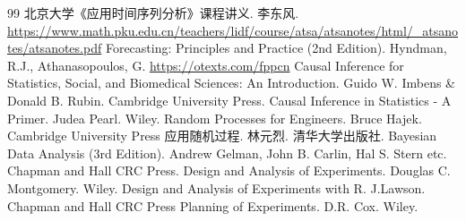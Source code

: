 \begin{thebibliography}{99}
    北京大学《应用时间序列分析》课程讲义. 李东风. \url{https://www.math.pku.edu.cn/teachers/lidf/course/atsa/atsanotes/html/_atsanotes/atsanotes.pdf}
    Forecasting: Principles and Practice (2nd Edition). Hyndman, R.J., Athanasopoulos, G. \url{https://otexts.com/fppcn}
    Causal Inference for Statistics, Social, and Biomedical Sciences: An Introduction. Guido W. Imbens \& Donald B. Rubin. Cambridge University Press.
    Causal Inference in Statistics - A Primer. Judea Pearl. Wiley.
    Random Processes for Engineers. Bruce Hajek. Cambridge University Press
    应用随机过程. 林元烈. 清华大学出版社.
    Bayesian Data Analysis (3rd Edition). Andrew Gelman, John B. Carlin, Hal S. Stern etc. Chapman and Hall CRC Press.
    Design and Analysis of Experiments. Douglas C. Montgomery. Wiley.
    Design and Analysis of Experiments with R. J.Lawson. Chapman and Hall CRC Press
    Planning of Experiments. D.R. Cox. Wiley.
\end{thebibliography}